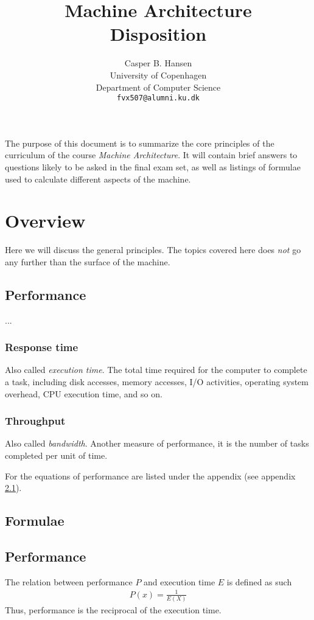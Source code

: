 \documentclass[11pt,a4paper]{article}
\title
{
	{\large Machine Architecture} \\
	Disposition	
}
\author
{
	Casper B. Hansen \\
	University of Copenhagen \\
	Department of Computer Science \\
	{\tt fvx507@alumni.ku.dk}
}
\newcommand{\appendixref}[1]{(see appendix \ref{#1})}
\begin{document}
\clearpage\maketitle\thispagestyle{empty}
\begin{multicols}{2}
\abstract
{
	\noindent
	The purpose of this document is to summarize the core principles of the
	curriculum of the course {\it Machine Architecture}. It will contain brief
	answers to questions likely to be asked in the final exam set, as well as
	listings of formulae used to calculate different aspects of the machine.
}
\vfill
\columnbreak
\tableofcontents
\end{multicols}

\newpage
\section{Overview}
Here we will discuss the general principles. The topics covered here does
{\it not} go any further than the surface of the machine.

\subsection{Performance}
...

\begin{multicols}{2}
\subsubsection{Response time}
Also called {\it execution time}. The total time required for the computer to
complete a task, including disk accesses, memory accesses, I/O activities,
operating system overhead, CPU execution time, and so on.
\vfill
\columnbreak
\subsubsection{Throughput}
Also called {\it bandwidth}. Another measure of performance, it is the number
of tasks completed per unit of time.
\end{multicols}
For the equations of performance are listed under the appendix
\appendixref{appendix:performance}. 

\newpage
\begin{appendices}
	\section{Formulae}
	\subsection{Performance}
	\label{appendix:performance}
	The relation between performance $P$ and execution time $E$ is defined as
	such
	\begin{align}
		P(x) = \frac{1}{E(X)}
	\end{align}
	Thus, performance is the reciprocal of the execution time.
\end{appendices}
\end{document}
